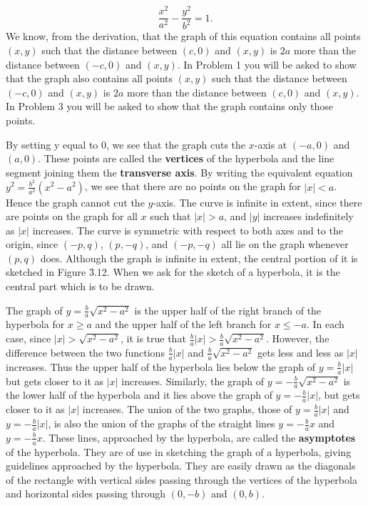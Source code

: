 $$
\frac{x^2}{a^2} - \frac{ y^2}{b^2} = 1. 
$$
\noindent We know, from the derivation, that the graph of this equation contains all points $(x, y)$ such that the distance between $(c, 0)$ and $(x, y)$ is $2a$ more than
the distance between $(-c, 0)$ and $(x, y)$. In Problem 1 you will be asked to show that the graph also contains all points $(x, y)$ such that the distance between $(-c, 0)$ and $(x, y)$ is $2a$ more than the distance between $(c, 0)$ and $(x, y)$. In Problem 3 you will be asked to show that the graph contains only those points.

By setting y equal to 0, we see that the graph cuts the $x$-axis at $(-a, 0)$ and $(a, 0)$. These points are called the \textbf{vertices} of the hyperbola and the line segment joining them the \textbf{transverse axis}. By writing the equivalent equation $y^2 = \frac{b^2}{a^2} (x^2 - a^2)$, we see that there are no points on the graph for $|x| < a$. Hence the graph cannot cut the $y$-axis. The curve is infinite in extent, since there are points on the graph for all $x$ such that $|x| > a$, and $|y|$ increases indefinitely as $|x|$ increases. The curve is symmetric with respect to both axes and to the origin, since  $(-p, q)$, $(p,-q)$, and $(-p,-q)$ all lie on the graph whenever $(p, q)$ does. Although the graph is infinite in extent, the central portion of it is sketched in Figure \f{3.12}. When we ask for the sketch of a hyperbola, it is the central part which is to be drawn.


The graph of $y = \frac{b}{a} \sqrt{x^2 - a^2} $ is the upper half of the right branch of the hyperbola for $x \geq a$ and the upper half of the left branch for $x \leq -a$. In each case, since $|x| > \sqrt{x^2 - a^2}$, it is true that $\frac{b}{a} |x| > \frac{b}{a} \sqrt{x^2 - a^2}$.  However, the difference between the two functions $\frac{b}{a} |x|$ and $\frac{b}{a} \sqrt{x^2 - a^2}$ gets less and less as $|x|$ increases. Thus the upper half of the hyperbola lies below the graph of $y = \frac{b}{a} |x|$ but gets closer to it as $|x|$ increases. Similarly, the graph of $y = -\frac{b}{a}\sqrt{x^2 - a^2}$ is the lower half of the hyperbola and it lies
above the graph of $y = - \frac{b}{a} |x|$, but gets closer to it as $|x|$ increases. The union of the two graphs, those of $y = \frac{b}{a} |x|$ and $y = - \frac{b}{a} |x|$, is also the union of the graphs of the straight lines $y = -\frac{b}{a} x$ and $y = - \frac{b}{a} x$. These lines, approached by the hyperbola, are called the \textbf{asymptotes} of the hyperbola. They are of use in sketching the graph of a hyperbola, giving guidelines approached by the hyperbola. They are easily drawn as the diagonals of the rectangle with vertical sides passing through the vertices of the hyperbola and horizontal sides passing through $(0, -b)$ and $(0, b)$.
\medskip

